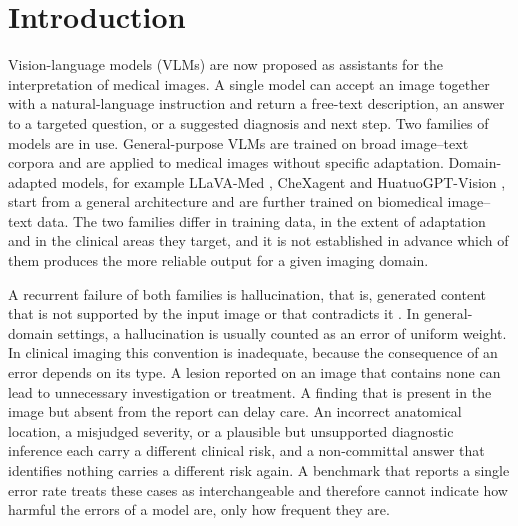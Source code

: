 \section{Introduction}
\label{sec:intro}


Vision-language models (VLMs) are now proposed as assistants for the interpretation of medical images. A single model can accept an image together with a natural-language instruction and return a free-text description, an answer to a targeted question, or a suggested diagnosis and next step. Two families of models are in use. General-purpose VLMs are trained on broad image--text corpora and are applied to medical images without specific adaptation. Domain-adapted models, for example LLaVA-Med \citep{li2023llavamed}, CheXagent \citep{chen2024chexagent} and HuatuoGPT-Vision \citep{chen2024huatuogptvision}, start from a general architecture and are further trained on biomedical image--text data. The two families differ in training data, in the extent of adaptation and in the clinical areas they target, and it is not established in advance which of them produces the more reliable output for a given imaging domain.

A recurrent failure of both families is hallucination, that is, generated content that is not supported by the input image or that contradicts it \citep{ji2023survey,bai2024hallucination}. In general-domain settings, a hallucination is usually counted as an error of uniform weight. In clinical imaging this convention is inadequate, because the consequence of an error depends on its type. A lesion reported on an image that contains none can lead to unnecessary investigation or treatment. A finding that is present in the image but absent from the report can delay care. An incorrect anatomical location, a misjudged severity, or a plausible but unsupported diagnostic inference each carry a different clinical risk, and a non-committal answer that identifies nothing carries a different risk again. A benchmark that reports a single error rate treats these cases as interchangeable and therefore cannot indicate how harmful the errors of a model are, only how frequent they are.

